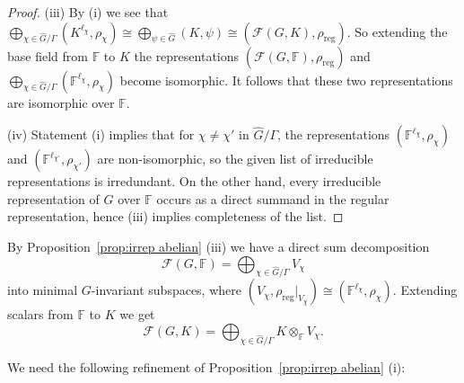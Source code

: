 \documentclass[12pt, oneside]{amsart}
\def\field{K}
\def\FF{\mathbb{F}}
\begin{document}
\begin{proof}
(iii)  By (i) we see that 
$\bigoplus_{\chi\in \widehat G/\Gamma}(\field^{\ell_\chi},\rho_\chi)
\cong \bigoplus_{\psi\in \widehat G}(\field,\psi)\cong (\mathcal{F}(G,\field),\rho_{\mathrm{reg}})$. 
So extending the base field from $\FF$ to $\field$ the representations 
$(\mathcal{F}(G,\FF),\rho_{\mathrm{reg}})$ and $\bigoplus_{\chi\in \widehat G/\Gamma}(\FF^{\ell_\chi},\rho_\chi)$ become isomorphic. 
It follows that these two representations are isomorphic over $\FF$. 

(iv) Statement (i) implies that for $\chi\neq \chi'$ in $\widehat G/\Gamma$, the representations 
$(\FF^{\ell_\chi},\rho_\chi)$ and $(\FF^{\ell_{\chi'}},\rho_{\chi'})$ are non-isomorphic, so the given list of irreducible representations is irredundant. 
On the other hand, 
every irreducible representation of $G$ over $\FF$ occurs as a direct summand 
in the regular representation, hence (iii) implies completeness of the list. 
 \end{proof} 

By Proposition~\ref{prop:irrep abelian} (iii) we have a direct sum decomposition 
\begin{equation}\label{eq:bigoplus V_chi}
\mathcal{F}(G,\FF)=\bigoplus_{\chi\in \widehat G/\Gamma}V_\chi 
\end{equation}  
into minimal $G$-invariant subspaces, where 
$(V_\chi,\rho_{\mathrm{reg}}\vert_{V_\chi})\cong (\FF^{\ell_\chi},\rho_\chi)$. 
Extending scalars from $\FF$ to $\field$ we get 
\begin{equation}\label{eq:bigoplus K tensor V_chi} 
\mathcal{F}(G,\field)=\bigoplus_{\chi\in \widehat G/\Gamma}\field\otimes_\FF V_\chi.
\end{equation} 

We need the following refinement of Proposition~\ref{prop:irrep abelian} (i): 
\end{document}
